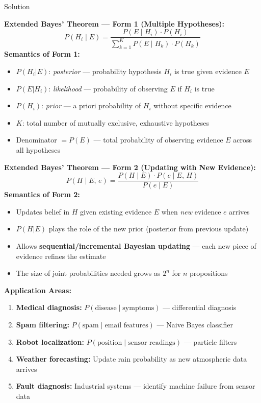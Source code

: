 \documentclass[12pt,a4paper]{article}
\begin{document}
\begin{solbox}{Solution}

\textbf{Extended Bayes' Theorem --- Form 1 (Multiple Hypotheses):}
\[
\boxed{P(H_i \mid E) = \frac{P(E \mid H_i)\cdot P(H_i)}{\displaystyle\sum_{k=1}^{K} P(E \mid H_k)\cdot P(H_k)}}
\]
\textbf{Semantics of Form 1:}
\begin{itemize}[noitemsep]
  \item $P(H_i|E)$: \textit{posterior} --- probability hypothesis $H_i$ is true given evidence $E$
  \item $P(E|H_i)$: \textit{likelihood} --- probability of observing $E$ if $H_i$ is true
  \item $P(H_i)$: \textit{prior} --- a priori probability of $H_i$ without specific evidence
  \item $K$: total number of mutually exclusive, exhaustive hypotheses
  \item Denominator $= P(E)$ --- total probability of observing evidence $E$ across all hypotheses
\end{itemize}

\bigskip
\textbf{Extended Bayes' Theorem --- Form 2 (Updating with New Evidence):}
\[
\boxed{P(H \mid E,\, e) = \frac{P(H \mid E)\cdot P(e \mid E,\, H)}{P(e \mid E)}}
\]
\textbf{Semantics of Form 2:}
\begin{itemize}[noitemsep]
  \item Updates belief in $H$ given existing evidence $E$ when \textit{new} evidence $e$ arrives
  \item $P(H|E)$ plays the role of the new prior (posterior from previous update)
  \item Allows \textbf{sequential/incremental Bayesian updating} --- each new piece of evidence refines the estimate
  \item The size of joint probabilities needed grows as $2^n$ for $n$ propositions
\end{itemize}

\bigskip
\textbf{Application Areas:}
\begin{enumerate}[noitemsep]
  \item \textbf{Medical diagnosis:} $P(\text{disease} \mid \text{symptoms})$ --- differential diagnosis
  \item \textbf{Spam filtering:} $P(\text{spam} \mid \text{email features})$ --- Naive Bayes classifier
  \item \textbf{Robot localization:} $P(\text{position} \mid \text{sensor readings})$ --- particle filters
  \item \textbf{Weather forecasting:} Update rain probability as new atmospheric data arrives
  \item \textbf{Fault diagnosis:} Industrial systems --- identify machine failure from sensor data
\end{enumerate}
\end{solbox}
\end{document}
